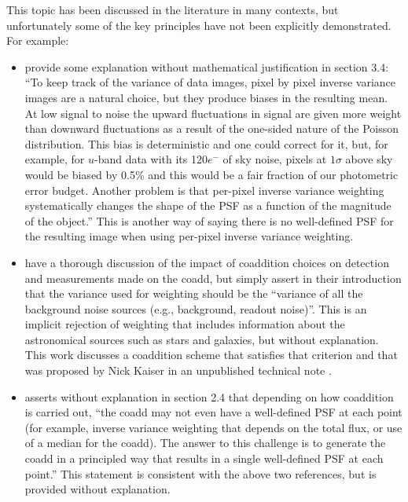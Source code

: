 \documentclass{openjournal}
\newcommand{\refresponse}[1]{#1}
\begin{document}
This topic has been discussed in the literature in many contexts, but unfortunately some of the key principles have not been explicitly demonstrated.  For example:
\begin{itemize}
\item \citet{2014ApJ...794..120A} provide some explanation without mathematical justification in section 3.4: ``To keep track of the variance of data images, pixel by
pixel inverse variance images are a natural choice, but
they produce biases in the resulting mean. At low signal to noise the upward fluctuations in signal are given
more weight than downward fluctuations as a result of
the one-sided nature of the Poisson distribution. This
bias is deterministic and one could correct for it, but,
for example, for $u$-band data with its 120$e^{-}$ of sky noise,
pixels at $1\sigma$ above sky would be biased by 0.5\% and this
would be a fair fraction of our photometric error budget. Another problem is that per-pixel inverse variance
weighting systematically changes the shape of the PSF
as a function of the magnitude of the object.''  This is another way of saying there is no well-defined PSF for the resulting image when using per-pixel inverse variance weighting.

\item \citet{2017ApJ...836..187Z} have a thorough discussion of the impact of coaddition choices on detection and measurements made on the coadd, but simply assert in their introduction that the variance used for weighting should be the ``variance of all the background noise sources (e.g., background, readout noise)''.  This is an implicit rejection of weighting that includes information about the astronomical sources such as stars and galaxies, but without explanation. This work discusses a coaddition scheme that satisfies that criterion and that was proposed by Nick Kaiser in an unpublished technical note \refresponse{\citep{Kaiser}}.

    \item \citet{2018ARA&A..56..393M} asserts without explanation in section 2.4 that depending on how coaddition is carried out, ``the coadd may not even have a well-defined PSF at each point (for example, inverse
variance weighting that depends on the total flux, or use of a median for the coadd). The
answer to this challenge is to generate the coadd in a principled way that results in a single
well-defined PSF at each point.'' This statement is consistent with the above two references, but is provided without explanation.


\end{itemize}
\end{document}

